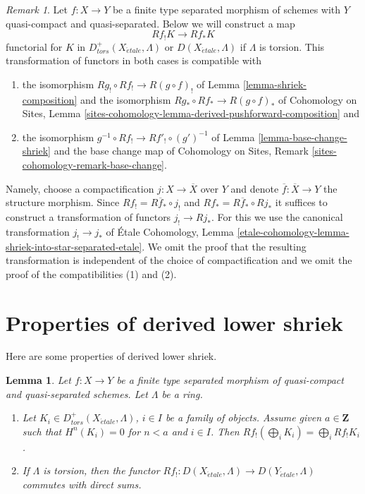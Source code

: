 \documentclass{stacks-project}
\theoremstyle{plain}
\newtheorem{lemma}[subsection]{Lemma}
\theoremstyle{definition}
\theoremstyle{remark}
\newtheorem{remark}[subsection]{Remark}
\numberwithin{equation}{subsection}
\def\etale{{\acute{e}tale}}
\begin{document}
\begin{remark}
\label{remark-shriek-to-star}
Let $f : X \to Y$ be a finite type separated morphism of schemes
with $Y$ quasi-compact and quasi-separated. Below we will construct
a map
$$
Rf_!K \longrightarrow Rf_*K
$$
functorial for $K$ in $D^+_{tors}(X_\etale, \Lambda)$ or
$D(X_\etale, \Lambda)$ if $\Lambda$ is torsion. This transformation
of functors in both cases is compatible with
\begin{enumerate}
\item the isomorphism $Rg_! \circ Rf_! \to R(g \circ f)_!$ of
Lemma \ref{lemma-shriek-composition} and the isomorphism
$Rg_* \circ Rf_* \to R(g \circ f)_*$ of
Cohomology on Sites, Lemma
\ref{sites-cohomology-lemma-derived-pushforward-composition} and
\item the isomorphism $g^{-1} \circ Rf_! \to Rf'_! \circ (g')^{-1}$
of Lemma \ref{lemma-base-change-shriek}
and the base change map of
Cohomology on Sites, Remark \ref{sites-cohomology-remark-base-change}.
\end{enumerate}
Namely, choose a compactification $j : X \to \overline{X}$ over $Y$
and denote $\overline{f} : \overline{X} \to Y$ the structure morphism.
Since $Rf_! = R\overline{f}_* \circ j_!$ and
$Rf_* = R\overline{f}_* \circ Rj_*$ it suffices to construct a
transformation of functors $j_! \to Rj_*$. For this we use the
canonical transformation $j_! \to j_*$ of
\'Etale Cohomology, Lemma
\ref{etale-cohomology-lemma-shriek-into-star-separated-etale}.
We omit the proof that the resulting transformation is independent
of the choice of compactification and we omit the proof of the
compatibilities (1) and (2).
\end{remark}













\section{Properties of derived lower shriek}
\label{section-derived-lower-shriek-properties}

\noindent
Here are some properties of derived lower shriek.

\begin{lemma}
\label{lemma-derived-lower-shriek-commute-direct-sums}
Let $f : X \to Y$ be a finite type separated morphism of quasi-compact
and quasi-separated schemes. Let $\Lambda$ be a ring.
\begin{enumerate}
\item Let $K_i \in D^+_{tors}(X_\etale, \Lambda)$, $i \in I$ be a family
of objects. Assume given $a \in \mathbf{Z}$ such that
$H^n(K_i) = 0$ for $n < a$ and $i \in I$. Then $Rf_!(\bigoplus_i K_i) =
\bigoplus_i Rf_!K_i$.
\item If $\Lambda$ is torsion, then the functor
$Rf_! : D(X_\etale, \Lambda) \to D(Y_\etale, \Lambda)$
commutes with direct sums.
\end{enumerate}
\end{lemma}
\end{document}
